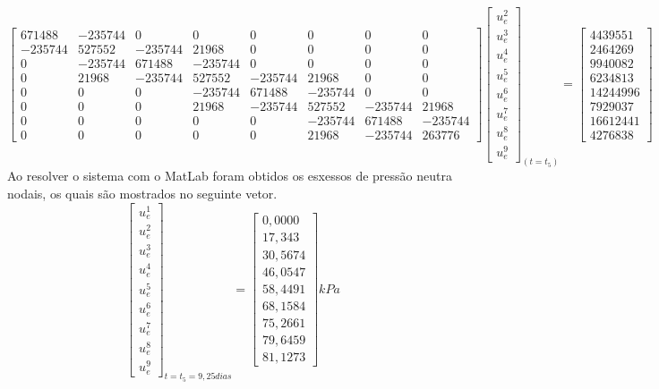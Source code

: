 \documentclass{article} %
\begin{document}
\begin{equation*}
\begin{bmatrix}
671488& -235744& 0& 0& 0& 0& 0& 0\\
-235744&527552&-235744&21968& 0& 0& 0& 0\\
0&-235744&671488&-235744& 0& 0& 0& 0\\
0&21968&-235744&527552&-235744&21968& 0& 0\\
0&0&0& -235744&671488&-235744& 0& 0\\
0&0&0&21968&-235744&527552&-235744&21968\\
0&0&0&0&0&-235744&671488&-235744\\
0&0&0&0&0&21968&-235744&263776
\end{bmatrix}\begin{bmatrix}
u_e^2\\
u_e^3\\
u_e^4\\
u_e^5\\
u_e^6\\
u_e^7\\
u_e^8\\
u_e^9
\end{bmatrix}_{(t=t_5)}
=\begin{bmatrix}
4439551\\
2464269\\
9940082\\
6234813\\
14244996\\
7929037\\
16612441\\
4276838
\end{bmatrix}
\end{equation*}
\indent Ao resolver o sistema com o MatLab foram obtidos os esxessos de pressão neutra nodais, os quais são mostrados no seguinte vetor.
\begin{equation}\label{t5}
\begin{bmatrix}
u_e^1\\
u_e^2\\
u_e^3\\
u_e^4\\
u_e^5\\
u_e^6\\
u_e^7\\
u_e^8\\
u_e^9
\end{bmatrix}_{t=t_5=9,25dias}=\begin{bmatrix}
0,0000\\
17,343\\
30,5674\\
46,0547\\
58,4491\\
68,1584\\
75,2661\\
79,6459\\
81,1273
\end{bmatrix}kPa
\end{equation}
\end{document}
